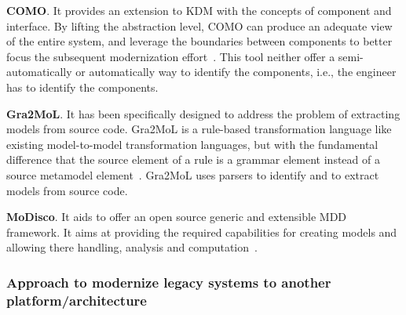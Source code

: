 \textbf{COMO}. It provides an extension to KDM with the concepts of component and interface. By lifting the abstraction level, COMO can produce an adequate view of the entire system, and leverage the boundaries between components to better focus the subsequent modernization effort~\cite{5773392}. This tool neither offer a semi-automatically or automatically way to identify the components, i.e., the engineer has to identify the components.

\textbf{Gra2MoL}. It has been specifically designed to address the problem of extracting models from source code. Gra2MoL is a rule-based transformation language like existing model-to-model transformation languages, but with the fundamental difference that the source element of a rule is a grammar element instead of a source metamodel element~\cite{5440163}. Gra2MoL uses parsers to identify and to extract models from source code.

\textbf{MoDisco}. It aids to offer an open source generic and extensible MDD framework. It aims at providing the required capabilities for creating models and allowing there handling, analysis and computation~\cite{Bruneliere:2010:MGE:1858996.1859032}.

\subsubsection{Approach to modernize legacy systems to another platform/architecture} %
\label{ssub:approach}


